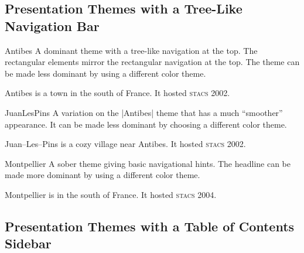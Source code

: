 \subsection{Presentation Themes with a Tree-Like Navigation Bar}

\begin{themeexample}{Antibes}
  A dominant theme with a tree-like navigation at the top. The rectangular elements mirror the rectangular navigation at the top. The theme can be made less dominant by using a different color theme.

  Antibes is a town in the south of France. It hosted \textsc{stacs} 2002.
\end{themeexample}

\begin{themeexample}{JuanLesPins}
  A variation on the |Antibes| theme that has a much ``smoother'' appearance. It can be made less dominant by choosing a different color theme.

  Juan--Les--Pins is a cozy village near Antibes. It hosted \textsc{stacs} 2002.
\end{themeexample}

\begin{themeexample}{Montpellier}
  A sober theme giving basic navigational hints. The headline can be made more dominant by using a different color theme.

  Montpellier is in the south of France. It hosted \textsc{stacs} 2004.
\end{themeexample}


\subsection{Presentation Themes with a Table of Contents Sidebar}

